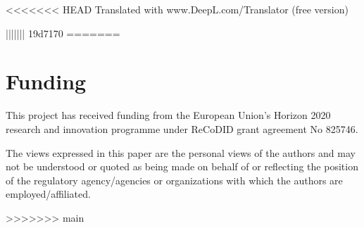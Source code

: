 \documentclass[
]{jss}
\begin{document}
<<<<<<< HEAD
Translated with www.DeepL.com/Translator (free version)

||||||| 19d7170
=======
\hypertarget{funding}{%
\section{Funding}\label{funding}}

This project has received funding from the European Union's Horizon 2020
research and innovation programme under ReCoDID grant agreement No
825746.

The views expressed in this paper are the personal views of the authors
and may not be understood or quoted as being made on behalf of or
reflecting the position of the regulatory agency/agencies or
organizations with which the authors are employed/affiliated.

>>>>>>> main
\renewcommand\refname{References}

\end{document}
